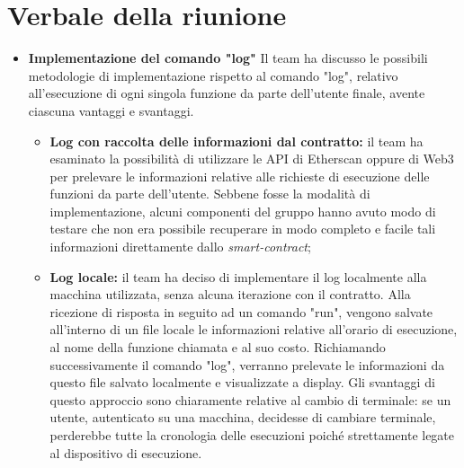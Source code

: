\section{Verbale della riunione}
	\begin{itemize}
		\item \textbf{Implementazione del comando "log"}
		Il team ha discusso le possibili metodologie di implementazione rispetto al comando "log", relativo all'esecuzione di ogni singola funzione da parte dell'utente finale, avente ciascuna vantaggi e svantaggi. 
		\begin{itemize}
			\item \textbf{Log con raccolta delle informazioni dal contratto:} il team ha esaminato la possibilità di utilizzare le API di Etherscan oppure di Web3 per prelevare le informazioni relative alle richieste di esecuzione delle funzioni da parte dell'utente. Sebbene fosse la modalità di implementazione, alcuni componenti del gruppo hanno avuto modo di testare che non era possibile recuperare in modo completo e facile tali informazioni direttamente dallo \textit{smart-contract\glos};
			\item \textbf{Log locale:} il team ha deciso di implementare il log localmente alla macchina utilizzata, senza alcuna iterazione con il contratto. Alla ricezione di risposta in seguito ad un comando "run", vengono salvate all'interno di un file locale le informazioni relative all'orario di esecuzione, al nome della funzione chiamata e al suo costo. Richiamando successivamente il comando "log", verranno prelevate le informazioni da questo file salvato localmente e visualizzate a display. Gli svantaggi di questo approccio sono chiaramente relative al cambio di terminale: se un utente, autenticato su una macchina, decidesse di cambiare terminale, perderebbe tutte la cronologia delle esecuzioni poiché strettamente legate al dispositivo di esecuzione.
		\end{itemize}

	\end{itemize}
